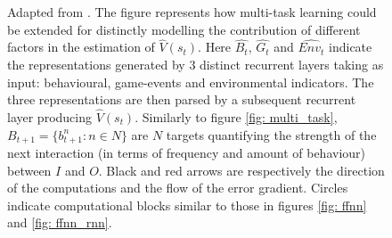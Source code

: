 \begin{figure}
\begin{center}
\begin{adjustbox}{width=0.4\textwidth}
        \end{adjustbox}
    \end{center}
\caption[\textbf{Neural Additive Model applied to a multi-task learning objective}]{Adapted from \cite{bengio2017deep}. The figure represents how multi-task learning could be extended for distinctly modelling the contribution of different factors in the estimation of $\widehat{V}(s_t)$. Here $\widehat{B_t}$, $\widehat{G_t}$ and $\widehat{Env_t}$ indicate the representations generated by 3 distinct recurrent layers taking as input: behavioural, game-events and environmental indicators. The three representations are then parsed by a subsequent recurrent layer producing $\widehat{V}(s_t)$. Similarly to figure \ref{fig: multi_task}, $B_{t+1}=\{b^n_{t+1}: n \in N\}$ are $N$ targets quantifying the strength of the next interaction (in terms of frequency and amount of behaviour)  between $I$ and $O$. Black and red arrows are respectively the direction of the computations and the flow of the error gradient. Circles indicate computational blocks similar to those in figures \ref{fig: ffnn} and \ref{fig: ffnn_rnn}.}
\label{fig: nam_multi_task}
\end{figure}